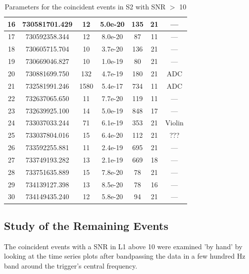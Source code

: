 \begin{table}[!h]
\begin{center}
\begin{tabular}{|c|c|c|c|c|c|c|}
16   &  730581701.429  &    12   &   5.0e-20    &     135   &    21  & ---      \\ \hline
17   &  730592358.344  &    12   &   8.0e-20    &      87   &    11  & ---      \\ \hline
18   &  730605715.704  &    10   &   3.7e-20    &     136   &    21  & ---      \\ \hline
19   &  730669046.827  &    10   &   1.0e-19    &      80   &    21  & ---      \\ \hline
20   &  730881699.750  &   132   &   4.7e-19    &     180   &    21  & ADC      \\ \hline
21   &  732581991.246  &  1580   &   5.4e-17    &     734   &    11  & ADC      \\ \hline
22   &  732637065.650  &    11   &   7.7e-20    &     119   &    11  & ---      \\ \hline
23   &  732639925.100  &    14   &   5.0e-19    &     848   &    17  & ---      \\ \hline
24   &  733037033.244  &    71   &   6.1e-19    &     353   &    21  & Violin   \\ \hline
25   &  733037804.016  &    15   &   6.4e-20    &     112   &    21  & ???      \\ \hline
26   &  733592255.881  &    11   &   2.4e-19    &     695   &    21  & ---      \\ \hline
27   &  733749193.282  &    13   &   2.1e-19    &     669   &    18  & ---      \\ \hline
28   &  733751635.889  &    15   &   7.8e-20    &      78   &    21  & ---      \\ \hline
29   &  734139127.398  &    13   &   8.5e-20    &      78   &    16  & ---      \\ \hline
30   &  734149435.240  &    12   &   5.8e-20    &      94   &    21  & ---      \\ \hline 
\end{tabular}
\end{center}
\caption[Coincident Events in S2]{Parameters for the coincident events in S2 with
                                  SNR $>$ 10}
\label{t:Events}
\end{table}

\subsection{Study of the Remaining Events}

The coincident events with a SNR in L1 above 10 were examined 'by hand'
by looking at the time series plots after bandpassing the data in a few hundred Hz
band around the trigger's central frequency.


